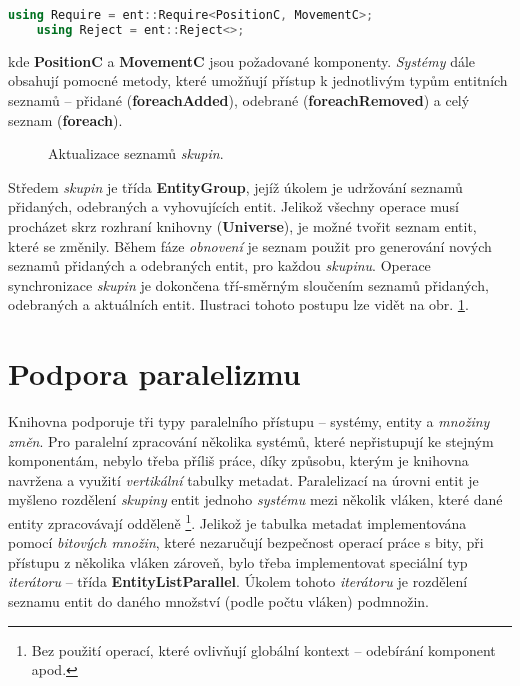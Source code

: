 \begin{lstlisting}[language=C++]
	using Require = ent::Require<PositionC, MovementC>;
	using Reject = ent::Reject<>;
\end{lstlisting}

\noindent kde \textbf{PositionC} a \textbf{MovementC} jsou požadované komponenty. \emph{Systémy} dále obsahují pomocné metody, které umožňují přístup k jednotlivým typům entitních seznamů -- přidané (\textbf{foreachAdded}), odebrané (\textbf{foreachRemoved}) a celý seznam (\textbf{foreach}). 

\begin{figure}[H]
	\begin{center}
	\end{center}
	\caption{Aktualizace seznamů \emph{skupin}.}
	\label{Fig:IMPLMerge}
\end{figure}

Středem \emph{skupin} je třída \textbf{EntityGroup}, jejíž úkolem je udržování seznamů přidaných, odebraných a vyhovujících entit. Jelikož všechny operace musí procházet skrz rozhraní knihovny (\textbf{Universe}), je možné tvořit seznam entit, které se změnily. Během fáze \emph{obnovení} je seznam použit pro generování nových seznamů přidaných a odebraných entit, pro každou \emph{skupinu}. Operace synchronizace \emph{skupin} je dokončena tří-směrným sloučením seznamů přidaných, odebraných a aktuálních entit. Ilustraci tohoto postupu lze vidět na obr. \ref{Fig:IMPLMerge}.

\section{Podpora paralelizmu}

Knihovna podporuje tři typy paralelního přístupu -- systémy, entity a \emph{množiny změn}. Pro paralelní zpracování několika systémů, které nepřistupují ke stejným komponentám, nebylo třeba příliš práce, díky způsobu, kterým je knihovna navržena a využití \emph{vertikální} tabulky metadat. Paralelizací na úrovni entit je myšleno rozdělení \emph{skupiny} entit jednoho \emph{systému} mezi několik vláken, které dané entity zpracovávají odděleně \footnote{Bez použití operací, které ovlivňují globální kontext -- odebírání komponent apod.}. Jelikož je tabulka metadat implementována pomocí \emph{bitových množin}, které nezaručují bezpečnost operací práce s bity, při přístupu z několika vláken zároveň, bylo třeba implementovat speciální typ \emph{iterátoru} -- třída \textbf{EntityListParallel}. Úkolem tohoto \emph{iterátoru} je rozdělení seznamu entit do daného množství (podle počtu vláken) podmnožin.

